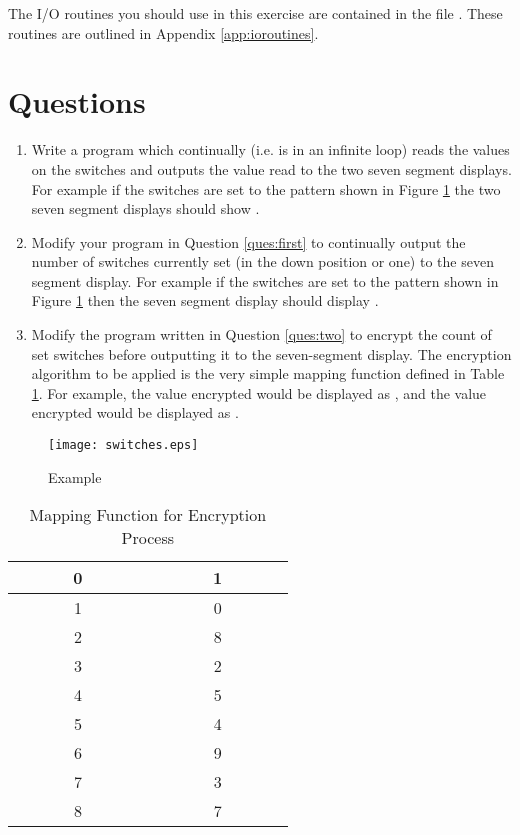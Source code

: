 \documentclass[a4paper,10pt]{article}
\begin{document}
The I/O routines you should use in this exercise are contained in the
file \LIBEXTWOP. These routines are outlined in Appendix
\ref{app:ioroutines}.

\section{Questions}
\begin{enumerate}
\item\label{ques:first} Write a program which continually (i.e. is in
an infinite loop) reads the values on the switches and outputs the
value read to the two seven segment displays.  For example if the
switches are set to the pattern shown in Figure \ref{fig:switches} the
two seven segment displays should show .

\item\label{ques:two} Modify your program in Question \ref{ques:first}
to continually output the number of switches currently set (in the
down position or one) to the seven segment display. For example if the
switches are set to the pattern shown in Figure \ref{fig:switches}
then the seven segment display should display .

\item\label{ques:final} Modify the program written in Question
\ref{ques:two} to encrypt the count of set switches before outputting
it to the seven-segment display. The encryption algorithm to be
applied is the very simple mapping function defined in Table
\ref{table:encode}. For example, the value  encrypted would be
displayed as , and the value  encrypted would be
displayed as .
\end{enumerate}

\begin{figure}[!hb]
\begin{center}
\texttt{[image: switches.eps]}
\caption{Example}
\label{fig:switches}
\end{center}
\end{figure}


\begin{table}[h]
\begin{center}
\begin{tabular}{|c|c|}
\hline
\verb|       |0\verb|       | & \verb|       |1\verb|       | \\ \hline
1 & 0 \\ \hline
2 & 8 \\ \hline
3 & 2 \\ \hline
4 & 5 \\ \hline
5 & 4 \\ \hline
6 & 9 \\ \hline
7 & 3 \\ \hline
8 & 7 \\ 
\hline
\end{tabular}
\end{center}
\caption{Mapping Function for Encryption Process}
\label{table:encode}
\end{table}
\end{document}
